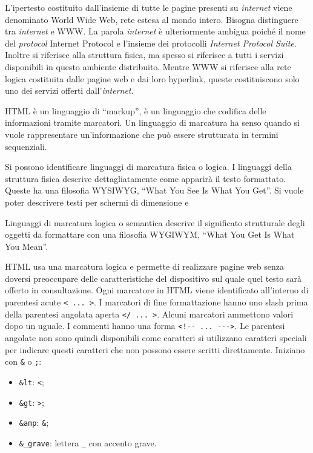 \documentclass{article}
\numberwithin{equation}{subsection}
\begin{document}
L'ipertesto costituito dall'insieme di tutte le pagine presenti su \textit{internet} viene denominato World Wide Web, rete estesa al mondo intero. 
Bisogna distinguere tra \textit{internet} e WWW. La parola \textit{internet} è ulteriormente ambigua poiché il nome del \textit{protocol} Internet Protocol e l'insieme dei protocolli \textit{Internet Protocol Suite}. 
Inoltre si riferisce alla struttura fisica, ma spesso si riferisce a tutti i servizi disponibili in questo ambiente distribuito. 
Mentre WWW si riferisce alla rete logica costituita dalle pagine web e dai loro hyperlink, queste costituiscono solo uno dei servizi offerti dall'\textit{internet}. 


\textcolor{Peach}{HTML} è un linguaggio di ``markup'', è un linguaggio che codifica delle informazioni tramite marcatori. Un linguaggio di marcatura ha senso quando si vuole rappresentare 
un'informazione che può essere strutturata in termini sequenziali. 

Si possono identificare linguaggi di marcatura fisica o logica. I linguaggi della struttura fisica descrive dettagliatamente come apparirà il testo formattato. 
Queste ha una filosofia WYSIWYG, ``What You See Is What You Get''. Si vuole poter descrivere testi per schermi di dimensione e 


Linguaggi di marcatura logica o semantica descrive il significato strutturale degli oggetti da formattare con una filosofia WYGIWYM, ``What You Get Is What You Mean''. 

\textcolor{Peach}{HTML} usa una marcatura logica e permette di realizzare pagine web senza doversi preoccupare delle caratteristiche del dispositivo sul quale quel testo sarà offerto in 
consultazione. 
Ogni marcatore in \textcolor{Peach}{HTML} viene identificato all'interno di parentesi acute \verb|< ... >|. I marcatori di fine formattazione hanno uno slash prima della parentesi angolata 
aperta \verb|</ ... >|. Alcuni marcatori ammettono valori dopo un uguale. 
I commenti hanno una forma \verb|<!-- ... --->|.
Le parentesi angolate non sono quindi disponibili come caratteri si utilizzano caratteri speciali per indicare questi caratteri che non possono essere scritti 
direttamente. Iniziano con \verb|&| o \verb|;|:
\begin{itemize}
    \item \verb|&lt|: \verb|<|;
    \item \verb|&gt|: \verb|>|;
    \item \verb|&amp|: \verb|&|;
    \item \verb|&_grave|: lettera \verb|_| con accento grave. 
\end{itemize} 
\end{document}
